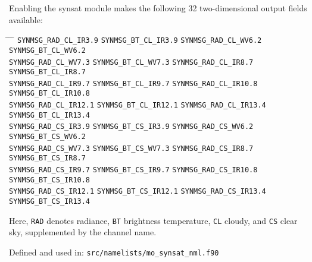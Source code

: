 Enabling the synsat module makes the following 32 two-dimensional output fields available:
%
{\renewcommand{\baselinestretch}{1.25}\normalsize%
\begin{tabbing}
\hspace*{14em} \= \hspace*{14em} \= \hspace*{14em} \= \hspace*{14em} \kill
\verb+SYNMSG_RAD_CL_IR3.9+   \>  \verb+SYNMSG_BT_CL_IR3.9+    \>
\verb+SYNMSG_RAD_CL_WV6.2+   \>   \verb+SYNMSG_BT_CL_WV6.2+   \\
\verb+SYNMSG_RAD_CL_WV7.3+   \>   \verb+SYNMSG_BT_CL_WV7.3+   \>
\verb+SYNMSG_RAD_CL_IR8.7+   \>   \verb+SYNMSG_BT_CL_IR8.7+   \\
\verb+SYNMSG_RAD_CL_IR9.7+   \>   \verb+SYNMSG_BT_CL_IR9.7+   \>
\verb+SYNMSG_RAD_CL_IR10.8+  \>   \verb+SYNMSG_BT_CL_IR10.8+  \\
\verb+SYNMSG_RAD_CL_IR12.1+  \>   \verb+SYNMSG_BT_CL_IR12.1+  \>
\verb+SYNMSG_RAD_CL_IR13.4+  \>   \verb+SYNMSG_BT_CL_IR13.4+  \\
\verb+SYNMSG_RAD_CS_IR3.9+   \>   \verb+SYNMSG_BT_CS_IR3.9+   \>
\verb+SYNMSG_RAD_CS_WV6.2+   \>   \verb+SYNMSG_BT_CS_WV6.2+   \\
\verb+SYNMSG_RAD_CS_WV7.3+   \>   \verb+SYNMSG_BT_CS_WV7.3+   \>
\verb+SYNMSG_RAD_CS_IR8.7+   \>   \verb+SYNMSG_BT_CS_IR8.7+   \\
\verb+SYNMSG_RAD_CS_IR9.7+   \>   \verb+SYNMSG_BT_CS_IR9.7+   \>
\verb+SYNMSG_RAD_CS_IR10.8+  \>   \verb+SYNMSG_BT_CS_IR10.8+  \\
\verb+SYNMSG_RAD_CS_IR12.1+  \>   \verb+SYNMSG_BT_CS_IR12.1+  \>
\verb+SYNMSG_RAD_CS_IR13.4+  \>   \verb+SYNMSG_BT_CS_IR13.4+
\end{tabbing}
}
Here, 
\verb+RAD+ denotes radiance, 
\verb+BT+ brightness temperature,
\verb+CL+ cloudy, and
\verb+CS+ clear sky, 
supplemented by the channel name.

Defined and used in: \verb+src/namelists/mo_synsat_nml.f90+


